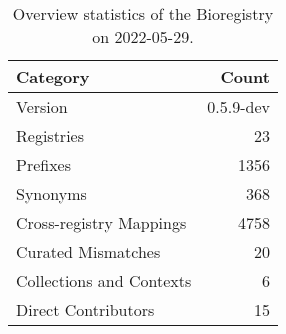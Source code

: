 \begin{table}
\centering
\caption{Overview statistics of the Bioregistry on 2022-05-29.}
\label{tab:bioregistry-summary}
\begin{tabular}{lr}
\toprule
                Category &     Count \\
\midrule
                 Version & 0.5.9-dev \\
              Registries &        23 \\
                Prefixes &      1356 \\
                Synonyms &       368 \\
 Cross-registry Mappings &      4758 \\
      Curated Mismatches &        20 \\
Collections and Contexts &         6 \\
     Direct Contributors &        15 \\
\bottomrule
\end{tabular}
\end{table}
